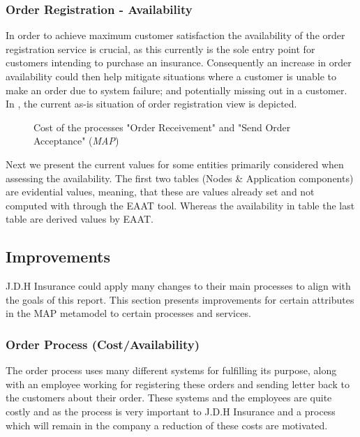 \subsubsection{Order Registration - Availability}
\label{sec:order_availability}
In order to achieve maximum customer satisfaction the availability of the order registration service is crucial, as this currently is the sole entry point for customers intending to purchase an insurance. Consequently an increase in order availability could then help mitigate situations where a customer is unable to make an order due to system failure; and potentially missing out in a customer. In , the current as-is situation of order registration view is depicted.
\begin{center}
	\begin{figure}[H]
		\centering
		\setlength\fboxsep{7pt}
		\setlength\fboxrule{0.5pt}
		\caption{Cost of the processes "Order Receivement" and "Send Order Acceptance" (\emph{MAP})}
		\label{fig:map_order_availability}
	\end{figure}
\end{center}
Next we present the current values for some entities primarily considered when assessing the availability. The first two tables (Nodes \& Application components) are evidential values, meaning, that these are values already set and not computed with through the EAAT tool. Whereas the availability in table the last table are derived values by EAAT.

%
\subsection{Improvements}
\label{sec:improvements}
J.D.H Insurance could apply many changes to their main processes to align with the goals of this report. This section presents improvements for certain attributes in the MAP metamodel to certain processes and services.
\subsubsection{Order Process (Cost/Availability)}
The order process uses many different systems for fulfilling its purpose, along with an employee working for registering these orders and sending letter back to the customers about their order. These systems and the employees are quite costly and as the process is very important to J.D.H Insurance and a process which will remain in the company a reduction of these costs are motivated.

